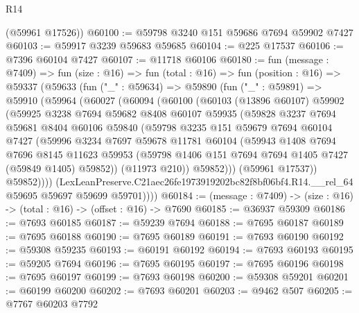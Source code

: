 \begin{lexlean}{R14}
\begin{coremodule}
      (@59961 @17526))
@60100 := @59798 @3240 @151 @59686 @7694 @59902 @7427
@60103 := @59917 @3239 @59683 @59685
@60104 := @225 @17537
@60106 := @7396 @60104 @7427
@60107 := @11718 @60106
@60180 := fun (message : @7409) =>
  fun (size : @16) =>
  fun (total : @16) =>
  fun (position : @16) =>
  @59337
    (@59633
      (fun ("_" : @59634) =>
      @59890
        (fun ("_" : @59891) =>
        @59910
          (@59964
            (@60027
              (@60094
                (@60100
                  (@60103
                    (@13896 @60107)
                    @59902
                    (@59925
                      @3238
                      @7694
                      @59682
                      @8408
                      @60107
                      @59935
                      (@59828
                        @3237
                        @7694
                        @59681
                        @8404
                        @60106
                        @59840
                        (@59798
                          @3235
                          @151
                          @59679
                          @7694
                          @60104
                          @7427
                          (@59996
                            @3234
                            @7697
                            @59678
                            @11781
                            @60104
                            (@59943
                              @1408
                              @7694
                              @7696
                              @8145
                              @11623
                              @59953
                              (@59798 @1406 @151 @7694 @7694 @1405 @7427 (@59849 @1405) @59852))
                            (@11973 @210))
                          @59852)))
                    (@59961 @17537))
                  @59852))))
          (LexLeanPreserve.C21aec26fe1973919202bc82f8bf06bf4.R14.__rel_64
            @59695
            @59697
            @59699
            @59701))))
@60184 := (message : @7409) -> (size : @16) -> (total : @16) -> (offset : @16) -> @7690
@60185 := @36937 @59309
@60186 := @7693 @60185
@60187 := @59239 @7694
@60188 := @7695 @60187
@60189 := @7695 @60188
@60190 := @7695 @60189
@60191 := @7693 @60190
@60192 := @59308 @59235
@60193 := @60191 @60192
@60194 := @7693 @60193
@60195 := @59205 @7694
@60196 := @7695 @60195
@60197 := @7695 @60196
@60198 := @7695 @60197
@60199 := @7693 @60198
@60200 := @59308 @59201
@60201 := @60199 @60200
@60202 := @7693 @60201
@60203 := @9462 @507
@60205 := @7767 @60203 @7792

\end{coremodule}
\end{lexlean}

